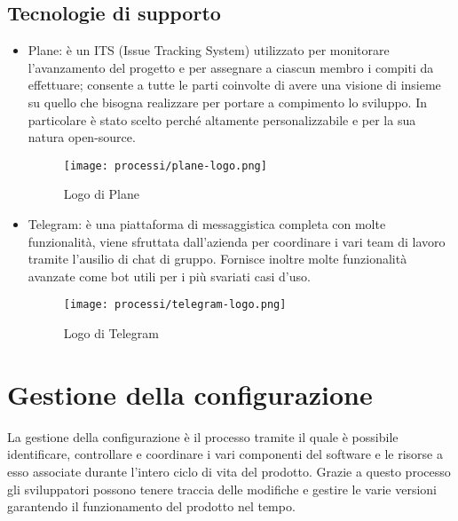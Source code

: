 \subsection{Tecnologie di supporto}
\begin{itemize}
    \item Plane: è un ITS (Issue Tracking System) utilizzato per monitorare l'avanzamento del progetto e per assegnare a ciascun membro i compiti da effettuare; consente a tutte le parti coinvolte di avere una visione di insieme su quello che bisogna realizzare per portare a compimento lo sviluppo. In particolare è stato scelto perché altamente personalizzabile e per la sua natura open-source.
    
    \begin{figure}[!h] 
        \centering 
        \texttt{[image: processi/plane-logo.png]} 
        \caption{Logo di Plane}
      \end{figure}

    \item Telegram: è una piattaforma di messaggistica completa con molte funzionalità, viene sfruttata dall'azienda per coordinare i vari team di lavoro tramite l'ausilio di chat di gruppo. Fornisce inoltre molte funzionalità avanzate come bot utili per i più svariati casi d'uso.
    
    \begin{figure}[!h] 
        \centering 
        \texttt{[image: processi/telegram-logo.png]} 
        \caption{Logo di Telegram}
      \end{figure}
\end{itemize}

\section{Gestione della configurazione}
La gestione della configurazione è il processo tramite il quale è possibile identificare, controllare e coordinare i vari componenti del software e le risorse a esso associate durante l'intero ciclo di vita del prodotto. Grazie a questo processo gli sviluppatori possono tenere traccia delle modifiche e gestire le varie versioni garantendo il funzionamento del prodotto nel tempo.

